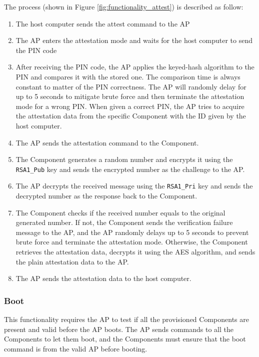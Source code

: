 \documentclass[11pt,oneside,onecolumn,letterpaper]{article}
\newcounter{alg}
\begin{document}
The process (shown in Figure \ref{fig:functionality_attest}) is described as follow:
\begin{enumerate}
	\item The host computer sends the attest command to the AP
	\item The AP enters the attestation mode and waits for the host computer to send the PIN code
	\item After receiving the PIN code,
	the AP applies the keyed-hash algorithm to the PIN and compares it with the stored one.
	The comparison time is always constant to matter of the PIN correctness.
	The AP will randomly delay for up to 5 seconds to mitigate brute force and then terminate the attestation mode for a wrong PIN.
	When given a correct PIN,
	the AP tries to acquire the attestation data from the specific Component with the ID given by the host computer.
	\item The AP sends the attestation command to the Component.
	\item The Component generates a random number and encrypts it using the \texttt{RSA1\_Pub} key and sends the encrypted number as the challenge to the AP.
	\item The AP decrypts the received message using the \texttt{RSA1\_Pri} key and sends the decrypted number as the response back to the Component.
	\item The Component checks if the received number equals to the original generated number.
	If not,
	the Component sends the verification failure message to the AP,
	and the AP randomly delays up to 5 seconds to prevent brute force and terminate the attestation mode.
	Otherwise,
	the Component retrieves the attestation data,
	decrypts it using the AES algorithm,
	and sends the plain attestation data to the AP.
	\item The AP sends the attestation data to the host computer.
\end{enumerate}

\subsubsection{Boot}
This functionality requires the AP to test if all the provisioned Components are present and valid before the AP boots.
The AP sends commands to all the Components to let them boot,
and the Components must ensure that the boot command is from the valid AP before booting.
\end{document}
